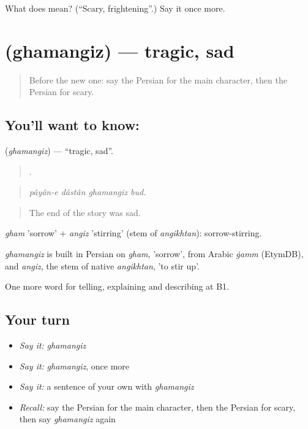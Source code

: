 \begin{tcolorbox}[breakable,colback=teal!4,colframe=teal!35!black,title={Before you move on}]
What does  mean? (\textquotedblleft{}Scary, frightening\textquotedblright{}.) Say it once more.
\end{tcolorbox}
\section[\texorpdfstring{\fa{غم} \fa{انگیز} (ghamangiz)}{غم انگیز (ghamangiz)}]{  (ghamangiz) — tragic, sad}

\label{lesson:FA-C530-ghamangiz}



\begin{quote}
Before the new one: say the Persian for the main character, then the Persian for scary.
\end{quote}

\subsection*{You'll want to know:  }
\textbf{ } (\emph{ghamangiz}) — \textquotedblleft{}tragic, sad\textquotedblright{}.

\begin{quote}
    .
\end{quote}

\begin{quote}
\emph{pâyân-e dâstân ghamangiz bud.}
\end{quote}

\begin{quote}
The end of the story was sad.
\end{quote}

\emph{gham} 'sorrow' + \emph{angiz} 'stirring' (stem of \emph{angikhtan}): sorrow-stirring.

\begin{cousinweb}
\emph{ghamangiz} is built in Persian on \emph{gham}, 'sorrow', from Arabic \emph{ġamm} (EtymDB), and \emph{angiz}, the stem of native \emph{angikhtan}, 'to stir up'.
\end{cousinweb}

\begin{grammarlens}[title={What you've built}]
One more word for telling, explaining and describing at B1.
\end{grammarlens}

\subsection*{Your turn}
\begin{itemize}
\raggedright
  \item \emph{Say it:} \emph{ghamangiz}
  \item \emph{Say it:} \emph{ghamangiz}, once more
  \item \emph{Say it:} a sentence of your own with \emph{ghamangiz}
  \item \emph{Recall:} say the Persian for the main character, then the Persian for scary, then say \emph{ghamangiz} again
\end{itemize}

